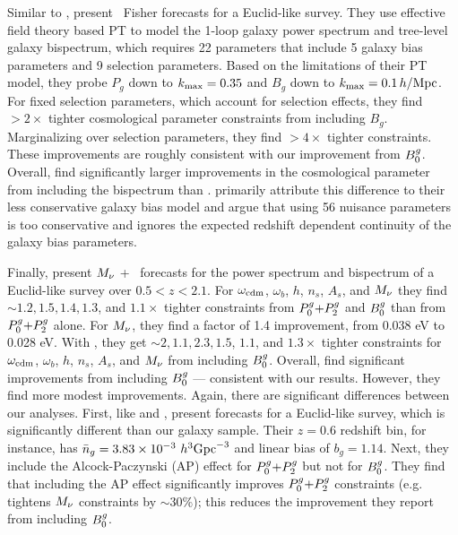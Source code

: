 Similar to \cite{yankelevich2019}, \cite{agarwal2020} present \lcdm~Fisher 
forecasts for a Euclid-like survey. 
They use effective field theory based PT to model the
1-loop galaxy power spectrum and tree-level galaxy bispectrum, which
requires 22 parameters that include 5 galaxy bias parameters and 9 selection 
parameters. Based on the limitations of their PT model, they probe 
$P_g$ down to $k_{\rm max} = 0.35$ and $B_g$ down to $k_{\rm max}= 0.1\,h/\mathrm{Mpc}$. 
For fixed selection parameters, which account for selection effects, they find $>2\times$
tighter cosmological parameter constraints from including $B_g$. Marginalizing
over selection parameters, they find $>4\times$ tighter constraints. These 
improvements are roughly consistent with our improvement from $B^g_0$. 
Overall, \cite{agarwal2020} find significantly larger improvements in the
cosmological parameter from including the bispectrum than \cite{yankelevich2019}. 
\cite{agarwal2020} primarily attribute this difference to their less conservative
galaxy bias model and argue that using 56 nuisance parameters~\citep{yankelevich2019} 
is too conservative and ignores the expected redshift dependent continuity 
of the galaxy bias parameters. 

Finally, \cite{chudaykin2019} present $M_\nu$ + \lcdm~forecasts for the power
spectrum and bispectrum of a Euclid-like survey over $0.5 < z < 2.1$. For
$\omega_{\rm cdm}$, $\omega_b$, $h$, $n_s$, $A_s$, and $M_\nu$ they find
${\sim}1.2, 1.5, 1.4, 1.3$, and $1.1\times$ tighter constraints from $P^g_0{+}P^g_2$ and
$B^g_0$ than from $P^g_0{+}P^g_2$ alone. For $M_\nu$, they find a factor of 1.4 improvement, 
from 0.038 eV to 0.028 eV. With \planck, they get ${\sim}2, 1.1, 2.3, 1.5$,
$1.1$, and $1.3\times$ tighter constraints for $\omega_{\rm cdm}$, $\omega_b$,
$h$, $n_s$, $A_s$, and $M_\nu$ from including $B^g_0$. Overall, \cite{chudaykin2019} 
find significant improvements from including $B^g_0$ --- consistent with our
results. However, they find more modest improvements. 
Again, there are significant differences between our analyses. First, like
\cite{yankelevich2019} and \cite{agarwal2020}, \cite{chudaykin2019} present forecasts for a
Euclid-like survey, which is significantly different than our galaxy sample.
Their $z = 0.6$ redshift bin, for instance, has $\bar{n}_g = 3.83 \times 10^{-3}~h^3{\rm
Gpc}^{-3}$ and linear bias of $b_g = 1.14$. Next, they include the
Alcock-Paczynski (AP) effect for $P^g_0{+}P^g_2$ but not for $B^g_0$. They find that
including the AP effect significantly improves $P^g_0{+}P^g_2$ constraints (e.g.
tightens $M_\nu$ constraints by ${\sim}30\%$); this reduces the improvement
they report from including $B^g_0$. 

